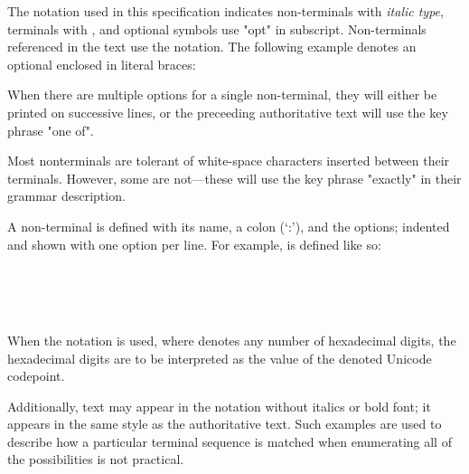 


\specsubitem
The notation used in this specification indicates non-terminals with
\textit{italic type}, terminals with , and optional
symbols use "opt" in subscript. Non-terminals referenced in the text use the
 notation. The following example denotes an optional
 enclosed in literal braces:

\begin{grammar}
\terminal{\{}  \terminal{\}}
\end{grammar}

\specsubitem
When there are multiple options for a single non-terminal, they will either be
printed on successive lines, or the preceeding authoritative text will use the
key phrase "one of".

\specsubitem
Most nonterminals are tolerant of white-space characters inserted between their
terminals. However, some are not---these will use the key phrase "exactly" in
their grammar description.

\specsubitem
A non-terminal is defined with its name, a colon (`:'), and the options;
indented and shown with one option per line. For example,
 is defined like so:

\begin{grammar}
 \\
	 \terminal{;} \\
	 \terminal{;}  \\
\end{grammar}

\specsubitem
When the  notation is used, where  denotes any number of
hexadecimal digits, the hexadecimal digits are to be interpreted as the value of
the denoted Unicode codepoint.


\specsubitem
Additionally, text may appear in the notation without italics or bold font; it
appears in the same style as the authoritative text. Such examples are used to
describe how a particular terminal sequence is matched when enumerating all of
the possibilities is not practical.

\begin{grammar}
 \\
	 \\
\end{grammar}








